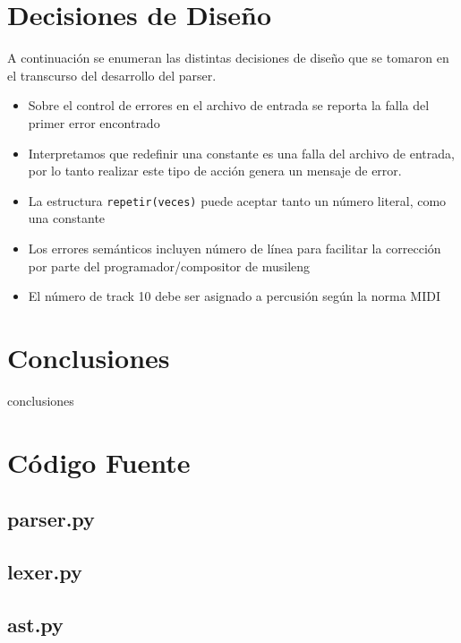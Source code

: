 \documentclass[a4paper,8pt]{article}
\begin{document}
\section{Decisiones de Diseño}
A continuación se enumeran las distintas decisiones de diseño que se tomaron en el transcurso del desarrollo del parser.
\begin{itemize}
\item Sobre el control de errores en el archivo de entrada se reporta la falla del primer error encontrado
\item Interpretamos que redefinir una constante es una falla del archivo de entrada, por lo tanto realizar este tipo de acción genera un mensaje de error.
\item La estructura \texttt{repetir(veces){}} puede aceptar tanto un número literal, como una constante
\item Los errores semánticos incluyen número de línea para facilitar la corrección por parte del programador/compositor de musileng
\item El número de track 10 debe ser asignado a percusión según la norma MIDI
\end{itemize}

\section{Conclusiones}
conclusiones

\newpage
\section{Código Fuente}

\subsection{parser.py}
\begin{small}
  
\end{small}
\newpage
\subsection{lexer.py}
\begin{small}
  
\end{small}
\newpage
\subsection{ast.py}
\begin{small}
  
\end{small}
\newpage
\end{document}

